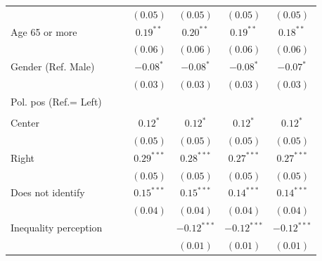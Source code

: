 \documentclass[
  12pt,
  a4paper,
]{article}
\begin{document}
\begin{table}[!ht]
\begin{center}
{\begin{tabular}{l c c c c c c}
                                    &               &               & $(0.05)$      & $(0.05)$      & $(0.05)$      & $(0.05)$      \\
\quad Age 65 or more                &               &               & $0.19^{**}$   & $0.20^{**}$   & $0.19^{**}$   & $0.18^{**}$   \\
                                    &               &               & $(0.06)$      & $(0.06)$      & $(0.06)$      & $(0.06)$      \\
Gender (Ref. Male)                  &               &               & $-0.08^{*}$   & $-0.08^{*}$   & $-0.08^{*}$   & $-0.07^{*}$   \\
                                    &               &               & $(0.03)$      & $(0.03)$      & $(0.03)$      & $(0.03)$      \\
Pol. pos (Ref.= Left)               &               &               &               &               &               &               \\
                                    &               &               &               &               &               &               \\
\quad Center                        &               &               & $0.12^{*}$    & $0.12^{*}$    & $0.12^{*}$    & $0.12^{*}$    \\
                                    &               &               & $(0.05)$      & $(0.05)$      & $(0.05)$      & $(0.05)$      \\
\quad Right                         &               &               & $0.29^{***}$  & $0.28^{***}$  & $0.27^{***}$  & $0.27^{***}$  \\
                                    &               &               & $(0.05)$      & $(0.05)$      & $(0.05)$      & $(0.05)$      \\
\quad Does not identify             &               &               & $0.15^{***}$  & $0.15^{***}$  & $0.14^{***}$  & $0.14^{***}$  \\
                                    &               &               & $(0.04)$      & $(0.04)$      & $(0.04)$      & $(0.04)$      \\
Inequality perception               &               &               &               & $-0.12^{***}$ & $-0.12^{***}$ & $-0.12^{***}$ \\
                                    &               &               &               & $(0.01)$      & $(0.01)$      & $(0.01)$      \\

\end{tabular}}
\end{center}
\end{table}
\end{document}
